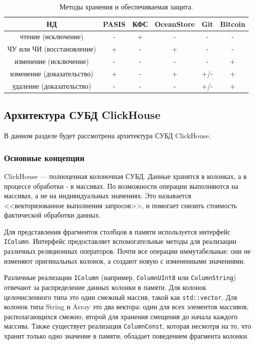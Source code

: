 \begin{table}[h]
    \begin{center}
        \label{tab:res}
        \caption{Методы хранения и обеспечиваемая защита.}
        \begin{tabular}{|c|c|c|c|c|c|}
            \hline
            \bfseries НД & \bfseries PASIS & \bfseries КФС & \bfseries OceanStore & \bfseries Git & \bfseries Bitcoin  \\
            \hline
            чтение (исключение) & - & + & - & - & - \\ \hline
            ЧУ или ЧИ (восстановление) & + & - & + & - & - \\ \hline
            изменение (исключение) & - & - & - & - & + \\ \hline
            изменение (доказательство) & + & - & + & +/- & + \\ \hline
            удаление (доказательство) & - & - & - & +/- & + \\ \hline
        \end{tabular}
    \end{center}
\end{table}

\clearpage

\subsection{Архитектура СУБД ClickHouse}

В данном разделе будет рассмотрена архитектура СУБД ClickHouse.

\subsubsection{Основные концепции}

ClickHouse --- полноценная колоночная СУБД. Данные хранятся в колонках, а в процессе обработки - в массивах. По возможности операции выполняются на массивах, а не на индивидуальных значениях. Это называется <<векторизованное выполнения запросов>>, и помогает снизить стоимость фактической обработки данных.

Для представления фрагментов столбцов в памяти используется интерфейс \texttt{IColumn}. Интерфейс предоставляет вспомогательные методы для реализации различных реляционных операторов. Почти все операции иммутабельные: они не изменяют оригинальных колонок, а создают новую с измененными значениями.

Различные реализации \texttt{IColumn} (например, \texttt{ColumnUInt8} или \texttt{ColumnString}) отвечают за распределение данных колонки в памяти. Для колонок целочисленного типа это один смежный массив, такой как \texttt{std::vector}. Для колонок типа String и Array это два вектора: один для всех элементов массивов, располагающихся смежно, второй для хранения смещения до начала каждого массива. Также существует реализация \texttt{ColumnConst}, которая несмотря на то, что хранит только одно значение в памяти, обладает поведением фрагмента колонки.

